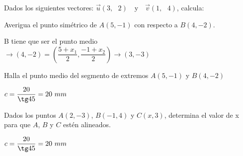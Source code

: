 \documentclass[spanish, 11pt]{exam}
\begin{document}
\begin{questions}
\question	Dados los siguientes vectores: $\overrightarrow u \left( {3,{\text{ }}2} \right){\text{ }}$ y ${\text{ }}\overrightarrow v \left( {1,{\text{ }}4} \right)$, calcula:
\begin{multicols}{4}
\end{multicols}

\question Averigua el punto simétrico de $A(5, -1)$ con respecto a $B(4, -2)$. 
\begin{solution} B tiene que ser el punto medio \\
 $ \to (4,-2)=(\dfrac{5+x_1}{2},\dfrac{-1+x_2}{2})\to (3,-3) $\end{solution}

\question Halla el punto medio del segmento de extremos $A(5, -1)$ y $B(4, -2)$ 
\begin{solution} $c=\dfrac{20}{\tg45} = 20 \ mm $\end{solution}

\question Dados los puntos $A(2, -3)$, $B(-1, 4)$ y $C(x, 3)$, determina el valor de x para que $A$, $B$ y $C$ estén alineados. 
\begin{solution} $c=\dfrac{20}{\tg45} = 20 \ mm $\end{solution}


\end{questions}
\end{document}

